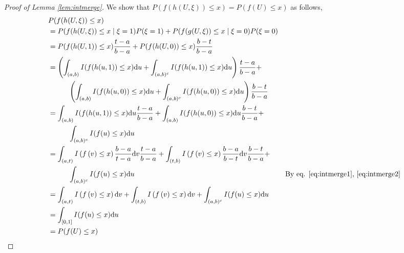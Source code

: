 \documentclass[12pt]{article}
\theoremstyle{plain}%
\theoremstyle{definition}
\def\d{\mathrm{d}}
\begin{document}
\begin{proof}[Proof of Lemma \ref{lem:intmerge}]
	We show that $P(f(h(U,\xi))\leq x)=P(f(U)\leq x)$ as follows,
	\begin{align*}
		&P(f(h(U,\xi))\leq x)\\
		&= P(f(h(U,\xi))\leq x\mid \xi=1)P(\xi=1) + P(f(g(U,\xi))\leq x\mid \xi=0)P(\xi=0)\\
		&= P(f(h(U,1))\leq x)\frac{t-a}{b-a} + P(f(h(U,0))\leq x)\frac{b-t}{b-a}\\
		&= \left(\int_{(a,b)}I(f(h(u,1))\leq x) \d u + \int_{(a,b)^c}I(f(h(u,1))\leq x) \d u\right)\frac{t-a}{b-a} + \\ &\hspace{1cm}\left(\int_{(a,b)}I(f(h(u,0))\leq x) \d u + \int_{(a,b)^c}I(f(h(u,0))\leq x) \d u\right)\frac{b-t}{b-a}\\
		&= \int_{(a,b)}I(f(h(u,1))\leq x) \d u \frac{t-a}{b-a} + \int_{(a,b)}I(f(h(u,0))\leq x) \d u \frac{b-t}{b-a} + \\ &\hspace{1cm} \int_{(a,b)^c}I(f(u)\leq x) \d u\\
		&= \int_{(a,t)}I\left(f\left(v\right)\leq x\right) \frac{b-a}{t-a}\d v \frac{t-a}{b-a} + \int_{(t,b)}I\left(f\left(v\right)\leq x\right) \frac{b-a}{b-t}\d v \frac{b-t}{b-a} + \\ 
		&\hspace{1cm}
		\int_{(a,b)^c}I(f(u)\leq x) \d u  & \text{By eq. \ref{eq:intmerge1}, \ref{eq:intmerge2}}\\
		&= \int_{(a,t)}I\left(f\left(v\right)\leq x\right) \d v + \int_{(t,b)}I\left(f\left(v\right)\leq x\right) \d v + 
		\int_{(a,b)^c}I(f(u)\leq x) \d u\\
		&= \int_{[0,1]}I(f(u)\leq x) \d u\\
		&= P(f(U)\leq x)
	\end{align*}
\end{proof}

	\printbibliography
\end{document}
